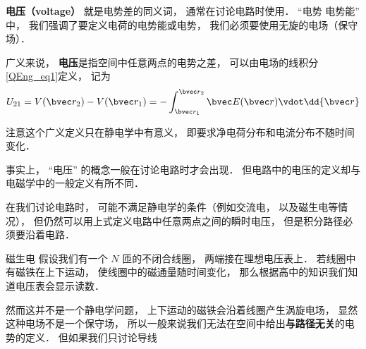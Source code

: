 

\textbf{电压（voltage）} 就是电势差的同义词， 通常在讨论电路时使用． “电势 电势能” 中， 我们强调了要定义电荷的电势能或电势， 我们必须要使用无旋的电场（保守场）．



广义来说， \textbf{电压}是指空间中任意两点的电势之差， 可以由电场的线积分\autoref{QEng_eq1}定义， 记为
\begin{equation}
U_{21} = V(\bvec r_2) - V(\bvec r_1) = - \int_{\bvec r_1}^{\bvec r_2} \bvec E(\bvec r) \vdot \dd{\bvec r}
\end{equation}

注意这个广义定义只在静电学中有意义， 即要求净电荷分布和电流分布不随时间变化．

事实上， “电压” 的概念一般在讨论电路时才会出现． 但电路中的电压的定义却与电磁学中的一般定义有所不同．

在我们讨论电路时， 可能不满足静电学的条件（例如交流电， 以及磁生电等情况）， 但仍然可以用上式定义电路中任意两点之间的瞬时电压， 但是积分路径必须要沿着电路．

\begin{exercise}{磁生电}
假设我们有一个 $N$ 匝的不闭合线圈， 两端接在理想电压表上． 若线圈中有磁铁在上下运动， 使线圈中的磁通量随时间变化， 那么根据高中的知识我们知道电压表会显示读数．

然而这并不是一个静电学问题， 上下运动的磁铁会沿着线圈产生涡旋电场， 显然这种电场不是一个保守场， 所以一般来说我们无法在空间中给出\textbf{与路径无关}的电势的定义． 但如果我们只讨论导线
\end{exercise}